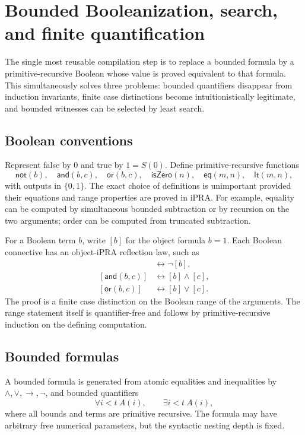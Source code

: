 \section{Bounded Booleanization, search, and finite quantification}
\label{sec:booleanization}

The single most reusable compilation step is to replace a bounded formula by a primitive-recursive Boolean whose value is proved equivalent to that formula.  This simultaneously solves three problems: bounded quantifiers disappear from induction invariants, finite case distinctions become intuitionistically legitimate, and bounded witnesses can be selected by least search.

\subsection{Boolean conventions}

Represent false by \(0\) and true by \(1=S(0)\).  Define primitive-recursive functions
\[
 \mathsf{not}(b),\quad \mathsf{and}(b,c),\quad \mathsf{or}(b,c),
 \quad \mathsf{isZero}(n),\quad \mathsf{eq}(m,n),\quad \mathsf{lt}(m,n),
\]
with outputs in \(\{0,1\}\).  The exact choice of definitions is unimportant provided their equations and range properties are proved in iPRA.  For example, equality can be computed by simultaneous bounded subtraction or by recursion on the two arguments; order can be computed from truncated subtraction.

For a Boolean term \(b\), write \([b]\) for the object formula \(b=1\).  Each Boolean connective has an object-iPRA reflection law, such as
\begin{align*}
 [\mathsf{not}(b)] &\leftrightarrow \neg[b],\\
 [\mathsf{and}(b,c)] &\leftrightarrow [b]\wedge[c],\\
 [\mathsf{or}(b,c)] &\leftrightarrow [b]\vee[c].
\end{align*}
The proof is a finite case distinction on the Boolean range of the arguments.  The range statement itself is quantifier-free and follows by primitive-recursive induction on the defining computation.

\subsection{Bounded formulas}

A bounded formula is generated from atomic equalities and inequalities by \(\wedge,\vee,\to,\neg\), and bounded quantifiers
\[
 \forall i<t\ A(i),\qquad \exists i<t\ A(i),
\]
where all bounds and terms are primitive recursive.  The formula may have arbitrary free numerical parameters, but the syntactic nesting depth is fixed.

